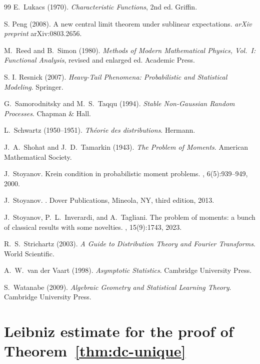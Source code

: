 \documentclass[12pt]{article}
\theoremstyle{definition}
\begin{document}
\begin{thebibliography}{99}
E.~Lukacs (1970).
\textit{Characteristic Functions}, 2nd ed.
Griffin.

S. Peng (2008).
A new central limit theorem under sublinear expectations.
\textit{arXiv preprint} arXiv:0803.2656.

M.~Reed and B.~Simon (1980).
\textit{Methods of Modern Mathematical Physics, Vol.~I:
Functional Analysis}, revised and enlarged ed.
Academic Press.

S. I. Resnick (2007).
\textit{Heavy-Tail Phenomena: Probabilistic and Statistical Modeling}.
Springer.

G.~Samorodnitsky and M.~S.~Taqqu (1994).
\textit{Stable Non-Gaussian Random Processes}.
Chapman \& Hall.

L.~Schwartz (1950--1951).
\textit{Th\'eorie des distributions}.
Hermann.


J.~A.~Shohat and J.~D.~Tamarkin (1943).
\textit{The Problem of Moments}.
American Mathematical Society.

J.~Stoyanov.
\newblock Krein condition in probabilistic moment problems.
, 6(5):939--949, 2000.

J.~Stoyanov.
.
\newblock Dover Publications, Mineola, NY, third edition, 2013.

J.~Stoyanov, P.~L.~Inverardi, and A.~Tagliani.
\newblock The problem of moments: a bunch of classical results with some novelties.
, 15(9):1743, 2023.

R.~S.~Strichartz (2003).
\textit{A Guide to Distribution Theory and Fourier Transforms}.
World Scientific.

A.~W.~van der Vaart (1998).
\textit{Asymptotic Statistics}.
Cambridge University Press.

S.~Watanabe (2009).
\textit{Algebraic Geometry and Statistical Learning Theory}.
Cambridge University Press.

\end{thebibliography}

\newpage

\appendix

\section{Leibniz estimate for the proof of Theorem~\ref{thm:dc-unique}}
\label{app:leibniz}
\end{document}
